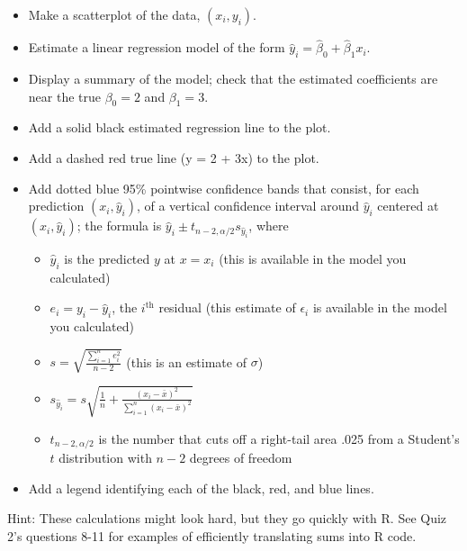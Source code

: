 \documentclass[]{article}
\providecommand{\tightlist}{%
  \setlength{\itemsep}{0pt}\setlength{\parskip}{0pt}}
\begin{document}
\begin{itemize}
\tightlist
\item
  Make a scatterplot of the data, \((x_i, y_i)\).
\item
  Estimate a linear regression model of the form
  \(\hat{y}_i = \hat{\beta}_0 + \hat{\beta}_1 x_i\).
\item
  Display a summary of the model; check that the estimated coefficients
  are near the true \(\beta_0 = 2\) and \(\beta_1 = 3\).
\item
  Add a solid black estimated regression line to the plot.
\item
  Add a dashed red true line (y = 2 + 3x) to the plot.
\item
  Add dotted blue 95\% pointwise confidence bands that consist, for each
  prediction \((x_i, \hat{y}_i)\), of a vertical confidence interval
  around \(\hat{y}_i\) centered at \((x_i, \hat{y}_i)\); the formula is
  \(\hat{y}_i \pm t_{n-2, \alpha/2} s_{\hat{y}_i}\), where

  \begin{itemize}
  \tightlist
  \item
    \(\hat{y}_i\) is the predicted \(y\) at \(x = x_i\) (this is
    available in the model you calculated)
  \item
    \(e_i = y_i - \hat{y}_i\), the \(i^{\text{th}}\) residual (this
    estimate of \(\epsilon_i\) is available in the model you calculated)
  \item
    \(s = \sqrt{\frac{\sum_{i=1}^n e_i^2}{n - 2}}\) (this is an estimate
    of \(\sigma\))
  \item
    \(s_{\hat{y}_i} = s \sqrt{\frac{1}{n} + \frac{(x_i - \bar{x})^2}{\sum_{i=1}^n (x_i - \bar{x})^2}}\)
  \item
    \(t_{n-2, \alpha/2}\) is the number that cuts off a right-tail area
    .025 from a Student's \(t\) distribution with \(n-2\) degrees of
    freedom
  \end{itemize}
\item
  Add a legend identifying each of the black, red, and blue lines.
\end{itemize}

Hint: These calculations might look hard, but they go quickly with R.
See Quiz 2's questions 8-11 for examples of efficiently translating sums
into R code.
\end{document}

